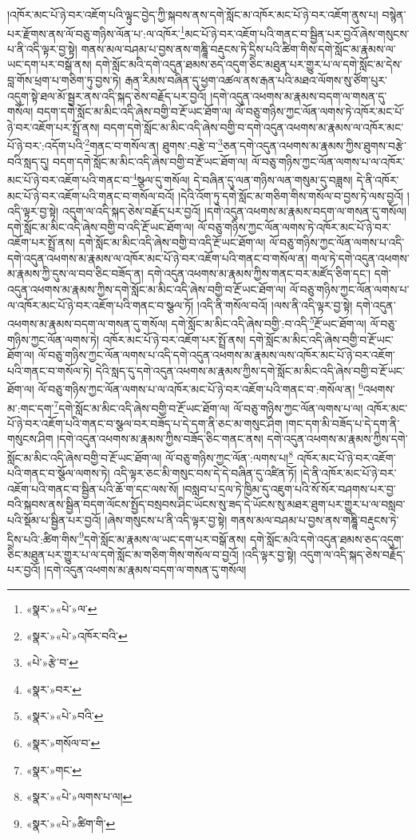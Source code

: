 །འཁོར་མང་པོ་ཉེ་བར་འཇོག་པའི་ལྟུང་བྱེད་ཀྱི་སྐབས་ནས་དགེ་སློང་མ་འཁོར་མང་པོ་ཉེ་བར་འཇོག་ནུས་པ། བསྙེན་པར་རྫོགས་ནས་ལོ་བཅུ་གཉིས་ལོན་པ་:ལ་འཁོར་\footnote{«སྣར་»«པེ་»ལ་}མང་པོ་ཉེ་བར་འཇོག་པའི་གནང་བ་སྦྱིན་པར་བྱའོ་ཞེས་གསུངས་པ་ནི་འདི་ལྟར་བྱ་སྟེ། གནས་མལ་བཤམ་པ་བྱས་ནས་གཎྜཱི་བརྡུངས་ཏེ་དྲིས་པའི་ཚིག་གིས་དགེ་སློང་མ་རྣམས་ལ་ཡང་དག་པར་བསྒོ་ནས། དགེ་སློང་མའི་དགེ་འདུན་ཐམས་ཅད་འདུག་ཅིང་མཐུན་པར་གྱུར་པ་ལ་དགེ་སློང་མ་དེས་བླ་གོས་ཕྲག་པ་གཅིག་ཏུ་བྱས་ཏེ། རྒན་རིམས་བཞིན་དུ་ཕྱག་འཚལ་ནས་རྒན་པའི་མཐའ་ལོགས་སུ་ཙོག་པུར་འདུག་སྟེ་ཐལ་མོ་སྦྱར་ནས་འདི་སྐད་ཅེས་བརྗོད་པར་བྱའོ། །དགེ་འདུན་འཕགས་མ་རྣམས་བདག་ལ་གསན་དུ་གསོལ། བདག་དགེ་སློང་མ་མིང་འདི་ཞེས་བགྱི་བ་རྔོ་ཡང་ཐོག་ལ། ལོ་བཅུ་གཉིས་ཀྱང་ལོན་ལགས་ཏེ་འཁོར་མང་པོ་ཉེ་བར་འཇོག་པར་སྤྲོ་ནས། བདག་དགེ་སློང་མ་མིང་འདི་ཞེས་བགྱི་བ་དགེ་འདུན་འཕགས་མ་རྣམས་ལ་འཁོར་མང་པོ་ཉེ་བར་:འདོག་པའི་\footnote{«སྣར་»«པེ་»འཁོར་བའི་}གནང་བ་གསོལ་ན། ཐུགས་:བརྩེ་བ་\footnote{«པེ་»རྩེ་བ་}ཅན་དགེ་འདུན་འཕགས་མ་རྣམས་ཀྱིས་ཐུགས་བརྩེ་བའི་སླད་དུ། བདག་དགེ་སློང་མ་མིང་འདི་ཞེས་བགྱི་བ་རྔོ་ཡང་ཐོག་ལ། ལོ་བཅུ་གཉིས་ཀྱང་ལོན་ལགས་པ་ལ་འཁོར་མང་པོ་ཉེ་བར་འཇོག་པའི་གནང་བ་\footnote{«སྣར་»བར་}སྩལ་དུ་གསོལ། དེ་བཞིན་དུ་ལན་གཉིས་ལན་གསུམ་དུ་བཟླས། དེ་ནི་འཁོར་མང་པོ་ཉེ་བར་འཇོག་པའི་གནང་བ་གསོལ་བའོ། །དེའི་འོག་ཏུ་དགེ་སློང་མ་གཅིག་གིས་གསོལ་བ་བྱས་ཏེ་ལས་བྱའོ། །འདི་ལྟར་བྱ་སྟེ། འདུག་ལ་འདི་སྐད་ཅེས་བརྗོད་པར་བྱའོ། །དགེ་འདུན་འཕགས་མ་རྣམས་བདག་ལ་གསན་དུ་གསོལ། དགེ་སློང་མ་མིང་འདི་ཞེས་བགྱི་བ་འདི་རྔོ་ཡང་ཐོག་ལ། ལོ་བཅུ་གཉིས་ཀྱང་ལོན་ལགས་ཏེ་འཁོར་མང་པོ་ཉེ་བར་འཇོག་པར་སྤྲོ་ནས། དགེ་སློང་མ་མིང་འདི་ཞེས་བགྱི་བ་འདི་རྔོ་ཡང་ཐོག་ལ། ལོ་བཅུ་གཉིས་ཀྱང་ལོན་ལགས་པ་འདི་དགེ་འདུན་འཕགས་མ་རྣམས་ལ་འཁོར་མང་པོ་ཉེ་བར་འཇོག་པའི་གནང་བ་གསོལ་ན། གལ་ཏེ་དགེ་འདུན་འཕགས་མ་རྣམས་ཀྱི་དུས་ལ་བབ་ཅིང་བཟོད་ན། དགེ་འདུན་འཕགས་མ་རྣམས་ཀྱིས་གནང་བར་མཛོད་ཅིག་དང་། དགེ་འདུན་འཕགས་མ་རྣམས་ཀྱིས་དགེ་སློང་མ་མིང་འདི་ཞེས་བགྱི་བ་རྔོ་ཡང་ཐོག་ལ། ལོ་བཅུ་གཉིས་ཀྱང་ལོན་ལགས་པ་ལ་འཁོར་མང་པོ་ཉེ་བར་འཇོག་པའི་གནང་བ་སྩལ་ཏོ། །འདི་ནི་གསོལ་བའོ། །ལས་ནི་འདི་ལྟར་བྱ་སྟེ། དགེ་འདུན་འཕགས་མ་རྣམས་བདག་ལ་གསན་དུ་གསོལ། དགེ་སློང་མ་མིང་འདི་ཞེས་བགྱི་:བ་འདི་\footnote{«སྣར་»«པེ་»བའི་}རྔོ་ཡང་ཐོག་ལ། ལོ་བཅུ་གཉིས་ཀྱང་ལོན་ལགས་ཏེ། འཁོར་མང་པོ་ཉེ་བར་འཇོག་པར་སྤྲོ་ནས། དགེ་སློང་མ་མིང་འདི་ཞེས་བགྱི་བ་རྔོ་ཡང་ཐོག་ལ། ལོ་བཅུ་གཉིས་ཀྱང་ལོན་ལགས་པ་འདི་དགེ་འདུན་འཕགས་མ་རྣམས་ལས་འཁོར་མང་པོ་ཉེ་བར་འཇོག་པའི་གནང་བ་གསོལ་ཏེ། དེའི་སླད་དུ་དགེ་འདུན་འཕགས་མ་རྣམས་ཀྱིས་དགེ་སློང་མ་མིང་འདི་ཞེས་བགྱི་བ་རྔོ་ཡང་ཐོག་ལ། ལོ་བཅུ་གཉིས་ཀྱང་ལོན་ལགས་པ་ལ་འཁོར་མང་པོ་ཉེ་བར་འཇོག་པའི་གནང་བ་:གསོལ་ན། \footnote{«སྣར་»གསོལ་བ་}འཕགས་མ་:གང་དག་\footnote{«སྣར་»གང་}དགེ་སློང་མ་མིང་འདི་ཞེས་བགྱི་བ་རྔོ་ཡང་ཐོག་ལ། ལོ་བཅུ་གཉིས་ཀྱང་ལོན་ལགས་པ་ལ། འཁོར་མང་པོ་ཉེ་བར་འཇོག་པའི་གནང་བ་སྩལ་བར་བཟོད་པ་དེ་དག་ནི་ཅང་མ་གསུང་ཤིག །གང་དག་མི་བཟོད་པ་དེ་དག་ནི་གསུངས་ཤིག །དགེ་འདུན་འཕགས་མ་རྣམས་ཀྱིས་བཟོད་ཅིང་གནང་ནས། དགེ་འདུན་འཕགས་མ་རྣམས་ཀྱིས་དགེ་སློང་མ་མིང་འདི་ཞེས་བགྱི་བ་རྔོ་ཡང་ཐོག་ལ། ལོ་བཅུ་གཉིས་ཀྱང་ལོན་:ལགས་པ།\footnote{«སྣར་»«པེ་»ལགས་པ་ལ།} འཁོར་མང་པོ་ཉེ་བར་འཇོག་པའི་གནང་བ་སྩོལ་ལགས་ཏེ། འདི་ལྟར་ཅང་མི་གསུང་བས་དེ་དེ་བཞིན་དུ་འཛིན་ཏོ། །དེ་ནི་འཁོར་མང་པོ་ཉེ་བར་འཇོག་པའི་གནང་བ་སྦྱིན་པའི་ཆོ་ག་དང་ལས་སོ། །བསླབ་པ་དྲལ་ཏེ་ཁྱིམ་དུ་འཇུག་པའི་སོ་སོར་བཤགས་པར་བྱ་བའི་སྐབས་ནས་སྦྱིན་བདག་ལོངས་སྤྱོད་བསྲབས་ཤིང་ཡོངས་སུ་ཟད་དེ་ཡོངས་སུ་མཐར་ཐུག་པར་གྱུར་པ་ལ་བསླབ་པའི་སྡོམ་པ་སྦྱིན་པར་བྱའོ། །ཞེས་གསུངས་པ་ནི་འདི་ལྟར་བྱ་སྟེ། གནས་མལ་བཤམ་པ་བྱས་ནས་གཎྜཱི་བརྡུངས་ཏེ་དྲིས་པའི་:ཚིག་གིས་\footnote{«སྣར་»«པེ་»ཚིག་གི་}དགེ་སློང་མ་རྣམས་ལ་ཡང་དག་པར་བསྒོ་ནས། དགེ་སློང་མའི་དགེ་འདུན་ཐམས་ཅད་འདུག་ཅིང་མཐུན་པར་གྱུར་པ་ལ་དགེ་སློང་མ་གཅིག་གིས་གསོལ་བ་བྱའོ། །འདི་ལྟར་བྱ་སྟེ། འདུག་ལ་འདི་སྐད་ཅེས་བརྗོད་པར་བྱའོ། །དགེ་འདུན་འཕགས་མ་རྣམས་བདག་ལ་གསན་དུ་གསོལ། 
